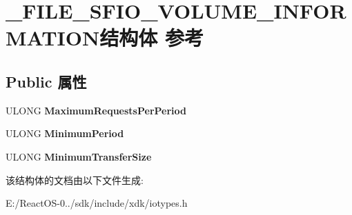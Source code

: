 \hypertarget{struct___f_i_l_e___s_f_i_o___v_o_l_u_m_e___i_n_f_o_r_m_a_t_i_o_n}{}\section{\+\_\+\+F\+I\+L\+E\+\_\+\+S\+F\+I\+O\+\_\+\+V\+O\+L\+U\+M\+E\+\_\+\+I\+N\+F\+O\+R\+M\+A\+T\+I\+O\+N结构体 参考}
\label{struct___f_i_l_e___s_f_i_o___v_o_l_u_m_e___i_n_f_o_r_m_a_t_i_o_n}
\subsection*{Public 属性}
\begin{DoxyCompactItemize}
\item 
\mbox{\label{struct___f_i_l_e___s_f_i_o___v_o_l_u_m_e___i_n_f_o_r_m_a_t_i_o_n_a799721cdda28d1c2bbb74856edb2fc3a}} 
U\+L\+O\+NG {\bfseries Maximum\+Requests\+Per\+Period}
\item 
\mbox{\label{struct___f_i_l_e___s_f_i_o___v_o_l_u_m_e___i_n_f_o_r_m_a_t_i_o_n_aac69caf54409055d9afe8a75592311e1}} 
U\+L\+O\+NG {\bfseries Minimum\+Period}
\item 
\mbox{\label{struct___f_i_l_e___s_f_i_o___v_o_l_u_m_e___i_n_f_o_r_m_a_t_i_o_n_a7466180dcb38303dc1f9560bcebff597}} 
U\+L\+O\+NG {\bfseries Minimum\+Transfer\+Size}
\end{DoxyCompactItemize}


该结构体的文档由以下文件生成\+:\begin{DoxyCompactItemize}
\item 
E\+:/\+React\+O\+S-\/0../sdk/include/xdk/iotypes.\+h\end{DoxyCompactItemize}
